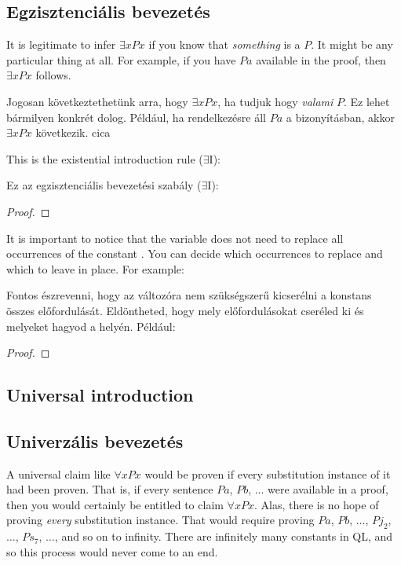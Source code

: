 \subsection{Egzisztenciális bevezetés}

It is legitimate to infer $\exists x Px$ if you know that \emph{something} is a $P$. It might be any particular thing at all. For example, if you have $Pa$ available in the proof, then $\exists x Px$ follows. 

Jogosan következtethetünk arra, hogy $\exists x Px$, ha tudjuk hogy \emph{valami} $P$. Ez lehet bármilyen konkrét dolog. Például, ha rendelkezésre áll $Pa$ a bizonyításban, akkor $ \exists x Px$ következik.
cica



This is the existential introduction rule ($\exists$I):

Ez az egzisztenciális bevezetési szabály ($\exists$I):

\begin{proof}
	 
\end{proof}

It is important to notice that the variable  does not need to replace all occurrences of the constant . You can decide which occurrences to replace and which to leave in place.
For example:

Fontos észrevenni, hogy az  változóra nem szükségszerű kicserélni a  konstans összes előfordulását. Eldöntheted, hogy mely előfordulásokat cseréled ki és melyeket hagyod a helyén.
Például: 
\nopagebreak
\begin{proof}
	 
	 
	 
	 
	 
\end{proof}

\subsection{Universal introduction}
\subsection*{Univerzális bevezetés}
A universal claim like $\forall x Px$ would be proven if {every} substitution instance of it had been proven. That is, if every sentence $Pa$, $Pb$, $\ldots$ were available in a proof, then you would certainly be entitled to claim $\forall x Px$. Alas, there is no hope of proving \emph{every} substitution instance. That would require proving $Pa$, $Pb$, $\ldots$, $Pj_2$, $\ldots$, $Ps_7$, $\ldots$, and so on to infinity. There are infinitely many constants in QL, and so this process would never come to an end.

